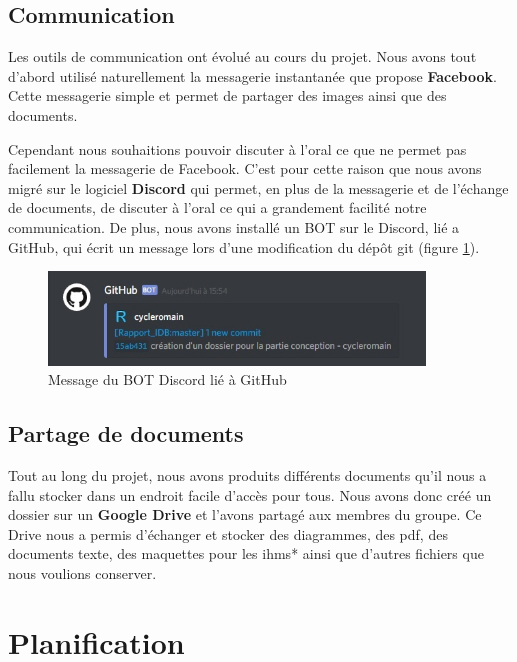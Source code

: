 \subsection{Communication}
Les outils de communication ont évolué au cours du projet. Nous avons tout d'abord utilisé naturellement la messagerie instantanée que propose \textbf{Facebook}. Cette messagerie simple et permet de partager des images ainsi que des documents.

Cependant nous souhaitions pouvoir discuter à l'oral ce que ne permet pas facilement la messagerie de Facebook. C'est pour cette raison que nous avons migré sur le logiciel \textbf{Discord} qui permet, en plus de la messagerie et de l'échange de documents, de discuter à l'oral ce qui a grandement facilité notre communication.
De plus, nous avons installé un BOT sur le Discord, lié a GitHub, qui écrit un message lors d'une modification du dép\^ot git (figure \ref{bot_discord}).

\begin{figure}[!h]
\centering
\includegraphics[width=10cm]{./images/activite/bot_discord.jpg}
\caption{Message du BOT Discord lié à GitHub}
\label{bot_discord}
\end{figure}

\subsection{Partage de documents}
Tout au long du projet, nous avons produits différents documents qu'il nous a fallu stocker dans un endroit facile d'accès pour tous. Nous avons donc créé un dossier sur un \textbf{Google Drive} et l'avons partagé aux membres du groupe. Ce Drive nous a permis d'échanger et stocker des diagrammes, des pdf, des documents texte, des maquettes pour les \glspl{ihm}* ainsi que d'autres fichiers que nous voulions conserver.

\section{Planification}